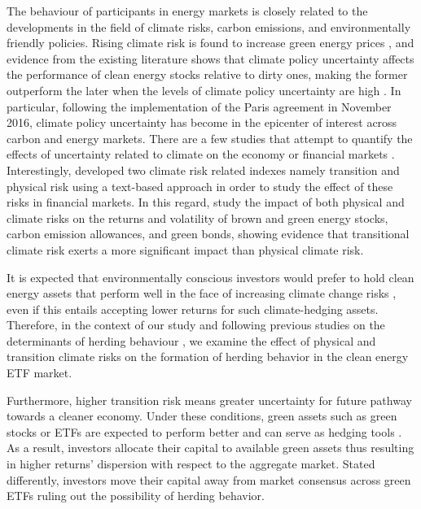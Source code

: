 \documentclass[
  letterpaper,
  DIV=11,
  numbers=noendperiod]{scrartcl}
\begin{document}
The behaviour of participants in energy markets is closely related to
the developments in the field of climate risks, carbon emissions, and
environmentally friendly policies. Rising climate risk is found to
increase green energy prices \citep{dutta2023}, and evidence from the
existing literature shows that climate policy uncertainty affects the
performance of clean energy stocks relative to dirty ones, making the
former outperform the later when the levels of climate policy
uncertainty are high \citep{bouri2022}. In particular, following the
implementation of the Paris agreement in November 2016, climate policy
uncertainty has become in the epicenter of interest across carbon and
energy markets. There are a few studies that attempt to quantify the
effects of uncertainty related to climate on the economy or financial
markets \citep[see inter alia,][]{gabriel2024, bolton2021, krueger2020}.
Interestingly, \citet{bua2024} developed two climate risk related
indexes namely transition and physical risk using a text-based approach
in order to study the effect of these risks in financial markets. In
this regard, \citet{bouri2023} study the impact of both physical and
climate risks on the returns and volatility of brown and green energy
stocks, carbon emission allowances, and green bonds, showing evidence
that transitional climate risk exerts a more significant impact than
physical climate risk.

It is expected that environmentally conscious investors would prefer to
hold clean energy assets that perform well in the face of increasing
climate change risks \citep[see][]{bouri2022}, even if this entails
accepting lower returns for such climate-hedging assets. Therefore, in
the context of our study and following previous studies on the
determinants of herding behaviour \citep[see][]{bouri2019, demirer2018},
we examine the effect of physical and transition climate risks on the
formation of herding behavior in the clean energy ETF market.

Furthermore, higher transition risk means greater uncertainty for future
pathway towards a cleaner economy. Under these conditions, green assets
such as green stocks or ETFs are expected to perform better and can
serve as hedging tools \citep[see inter alia][]{pastor}. As a result,
investors allocate their capital to available green assets thus
resulting in higher returns' dispersion with respect to the aggregate
market. Stated differently, investors move their capital away from
market consensus across green ETFs ruling out the possibility of herding
behavior.
\end{document}
